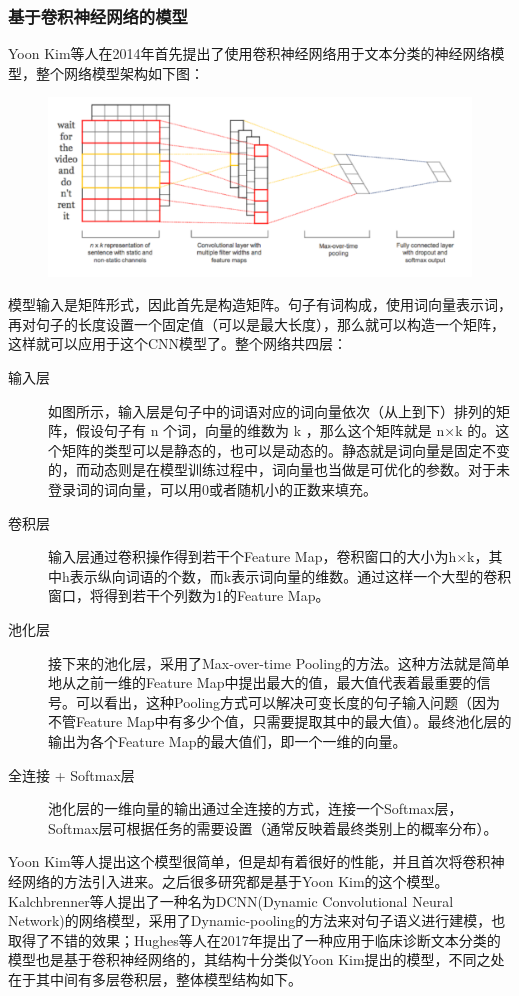\documentclass[UTF8]{ctexart}
\begin{document}
\subsubsection{基于卷积神经网络的模型}
Yoon Kim等人在2014年首先提出了使用卷积神经网络用于文本分类的神经网络模型，整个网络模型架构如下图：
\begin{figure}[H]
	\centering \includegraphics[width=0.5\textheight]{textCNN}
\end{figure}
模型输入是矩阵形式，因此首先是构造矩阵。句子有词构成，使用词向量表示词，再对句子的长度设置一个固定值（可以是最大长度），那么就可以构造一个矩阵，这样就可以应用于这个CNN模型了。整个网络共四层：
\begin{description}
	\item[输入层] 如图所示，输入层是句子中的词语对应的词向量依次（从上到下）排列的矩阵，假设句子有 n 个词，向量的维数为 k ，那么这个矩阵就是 n×k 的。这个矩阵的类型可以是静态的，也可以是动态的。静态就是词向量是固定不变的，而动态则是在模型训练过程中，词向量也当做是可优化的参数。对于未登录词的词向量，可以用0或者随机小的正数来填充。
	\item[卷积层] 输入层通过卷积操作得到若干个Feature Map，卷积窗口的大小为h×k，其中h表示纵向词语的个数，而k表示词向量的维数。通过这样一个大型的卷积窗口，将得到若干个列数为1的Feature Map。
	\item[池化层] 接下来的池化层，采用了Max-over-time Pooling的方法。这种方法就是简单地从之前一维的Feature Map中提出最大的值，最大值代表着最重要的信号。可以看出，这种Pooling方式可以解决可变长度的句子输入问题（因为不管Feature Map中有多少个值，只需要提取其中的最大值）。最终池化层的输出为各个Feature Map的最大值们，即一个一维的向量。
	\item[全连接 + Softmax层] 池化层的一维向量的输出通过全连接的方式，连接一个Softmax层，Softmax层可根据任务的需要设置（通常反映着最终类别上的概率分布）。
\end{description}
	\par Yoon Kim等人提出这个模型很简单，但是却有着很好的性能，并且首次将卷积神经网络的方法引入进来。之后很多研究都是基于Yoon Kim的这个模型。Kalchbrenner等人提出了一种名为DCNN(Dynamic Convolutional Neural Network)的网络模型，采用了Dynamic-pooling的方法来对句子语义进行建模，也取得了不错的效果；Hughes等人在2017年提出了一种应用于临床诊断文本分类的模型也是基于卷积神经网络的，其结构十分类似Yoon Kim提出的模型，不同之处在于其中间有多层卷积层，整体模型结构如下。
\end{document}
